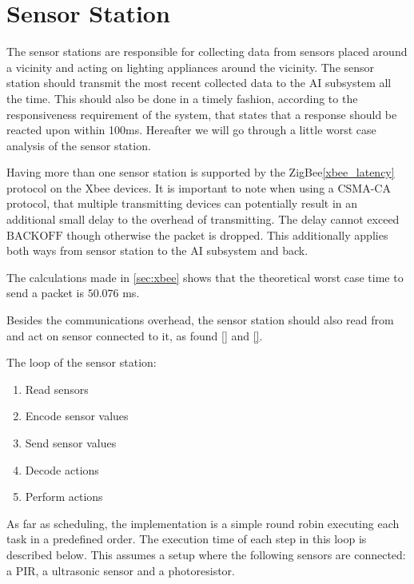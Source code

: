 \section{Sensor Station}\label{sub:sensorStation}

The sensor stations are responsible for collecting data from sensors placed around a vicinity and acting on lighting appliances around the vicinity. The sensor station should transmit the most recent collected data to the AI subsystem all the time. This should also be done in a timely fashion, according to the responsiveness requirement of the system, that states that a response should be reacted upon within 100ms. Hereafter we will go through a little worst case analysis of the sensor station.

Having more than one sensor station is supported by the ZigBee\cref{xbee_latency} protocol on the Xbee devices. It is important to note when using a CSMA-CA protocol, that multiple transmitting devices can potentially result in an additional small delay to the overhead of transmitting. The delay cannot exceed $\text{BACKOFF}$ though otherwise the packet is dropped. This additionally applies both ways from sensor station to the AI subsystem and back.

The calculations made in \cref{sec:xbee} shows that the theoretical worst case time to send a packet is $50.076$ ms.

Besides the communications overhead, the sensor station should also read from and act on sensor connected to it,  as found \cref{} and \cref{}.

The loop of the sensor station:
\begin{enumerate}
  \item Read sensors
  \item Encode sensor values
  \item Send sensor values
  \item Decode actions
  \item Perform actions
\end{enumerate}

As far as scheduling, the implementation is a simple round robin executing each task in a predefined order. The execution time of each step in this loop is described below. This assumes a setup where the following sensors are connected: a PIR, a ultrasonic sensor and a photoresistor.

